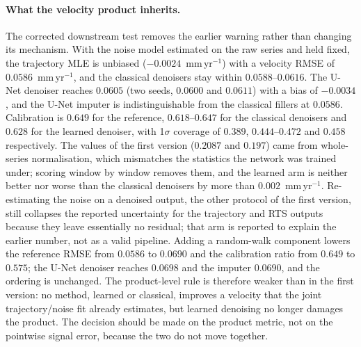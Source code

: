 \paragraph{What the velocity product inherits.}
The corrected downstream test removes the earlier warning rather than changing
its mechanism. With the noise model estimated on the raw series and held fixed,
the trajectory MLE is unbiased ($-0.0024$~mm\,yr$^{-1}$) with a velocity RMSE of
$0.0586$~mm\,yr$^{-1}$, and the classical denoisers stay within
$0.0588$--$0.0616$. The U-Net denoiser reaches $0.0605$ (two seeds, $0.0600$ and
$0.0611$) with a bias of $-0.0034$, and the U-Net imputer is indistinguishable
from the classical fillers at $0.0586$. Calibration is $0.649$ for the
reference, $0.618$--$0.647$ for the classical denoisers and $0.628$ for the
learned denoiser, with 1$\sigma$ coverage of $0.389$, $0.444$--$0.472$ and
$0.458$ respectively. The values of the first version ($0.2087$ and $0.197$)
came from whole-series normalisation, which mismatches the statistics the
network was trained under; scoring window by window removes them, and the
learned arm is neither better nor worse than the classical denoisers by more
than $0.002$~mm\,yr$^{-1}$. Re-estimating the noise on a denoised output, the
other protocol of the first version, still collapses the reported uncertainty
for the trajectory and RTS outputs because they leave essentially no residual;
that arm is reported to explain the earlier number, not as a valid pipeline.
Adding a random-walk component lowers the reference RMSE from $0.0586$ to
$0.0690$ and the calibration ratio from $0.649$ to $0.575$; the U-Net denoiser
reaches $0.0698$ and the imputer $0.0690$, and the ordering is unchanged. The
product-level rule is therefore weaker than in the first version: no method,
learned or classical, improves a velocity that the joint trajectory/noise fit
already estimates, but learned denoising no longer damages the product. The
decision should be made on the product metric, not on the pointwise signal
error, because the two do not move together.

